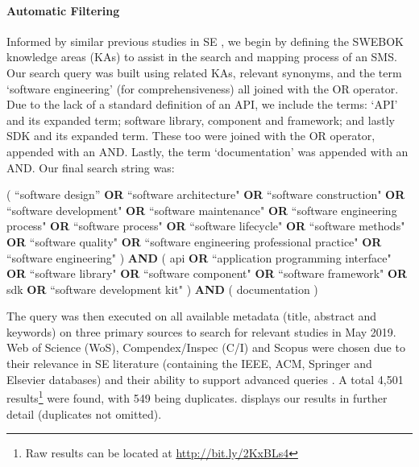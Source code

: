 \paragraph{Automatic Filtering}

Informed by similar previous studies in SE  \citep{Glass:2002wa,Usman:2017hn,GAROUSI2019101}, we begin by defining the SWEBOK \citep{IEEE:1990wp} knowledge areas (KAs) to assist in the search and mapping process of an SMS. Our search query was built using related KAs, relevant synonyms, and the term `software engineering' (for comprehensiveness) all joined with the OR operator. Due to the lack of a standard definition of an API, we include the terms: `API' and its expanded term; software library, component and framework; and lastly SDK and its expanded term. These too were joined with the OR operator, appended with an AND. Lastly, the term `documentation' was appended with an AND.
Our final search string was:
\begin{framed}
\noindent
\parbox{\linewidth}{
\footnotesize
( ``software design'' \textbf{OR} ``software architecture" \textbf{OR} ``software construction" \textbf{OR} ``software development" \textbf{OR} ``software maintenance" \textbf{OR} ``software engineering process" \textbf{OR} ``software process" \textbf{OR} ``software lifecycle" \textbf{OR} ``software methods" \textbf{OR} ``software quality" \textbf{OR} ``software engineering professional practice" \textbf{OR} ``software engineering" ) \textbf{AND} ( api \textbf{OR} ``application programming interface" \textbf{OR} ``software library" \textbf{OR} ``software component" \textbf{OR} ``software framework" \textbf{OR} sdk \textbf{OR} ``software development kit" ) \textbf{AND} ( documentation )
}
\end{framed}

The query was then executed on all available metadata (title, abstract and keywords) on three primary sources to search for relevant studies in May 2019. Web of Science  (WoS), Compendex/Inspec (C/I) and Scopus were chosen due to their relevance in SE literature (containing the IEEE, ACM, Springer and Elsevier databases) and their ability to support advanced queries \citep{Brereton:2007by,Kitchenham:2007dd}. A total 4,501 results\footnote{Raw results can be located at \url{http://bit.ly/2KxBLs4}} were found, with 549 being duplicates.  displays our results in further detail (duplicates not omitted).%

